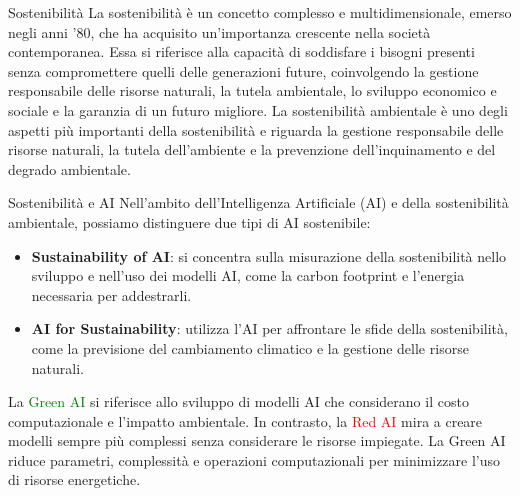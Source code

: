 
\begin{frame}{Sostenibilità} 
        La sostenibilità è un concetto complesso e multidimensionale, emerso negli anni '80, che ha acquisito un'importanza crescente nella società contemporanea. Essa si riferisce alla capacità di soddisfare i bisogni presenti senza compromettere quelli delle generazioni future, coinvolgendo la gestione responsabile delle risorse naturali, la tutela ambientale, lo sviluppo economico e sociale e la garanzia di un futuro migliore.
        La sostenibilità ambientale è uno degli aspetti più importanti della sostenibilità e riguarda la gestione responsabile
        delle risorse naturali, la tutela dell’ambiente e la prevenzione dell’inquinamento e del degrado ambientale. 
\end{frame}

\begin{frame}{Sostenibilità e AI} 
Nell'ambito dell'Intelligenza Artificiale (AI) e della sostenibilità ambientale, possiamo distinguere due tipi di AI sostenibile:
\begin{itemize}
\item \textbf{Sustainability of AI}: si concentra sulla misurazione della sostenibilità nello sviluppo e nell'uso dei modelli AI, come la carbon footprint e l'energia necessaria per addestrarli.
\item \textbf{AI for Sustainability}: utilizza l'AI per affrontare le sfide della sostenibilità, come la previsione del cambiamento climatico e la gestione delle risorse naturali.
\end{itemize}
La \textcolor{green}{Green AI} si riferisce allo sviluppo di modelli AI che considerano il costo computazionale e l'impatto ambientale. In contrasto, la \textcolor{red}{Red AI} mira a creare modelli sempre più complessi senza considerare le risorse impiegate. La Green AI riduce parametri, complessità e operazioni computazionali per minimizzare l'uso di risorse energetiche.
\end{frame}
